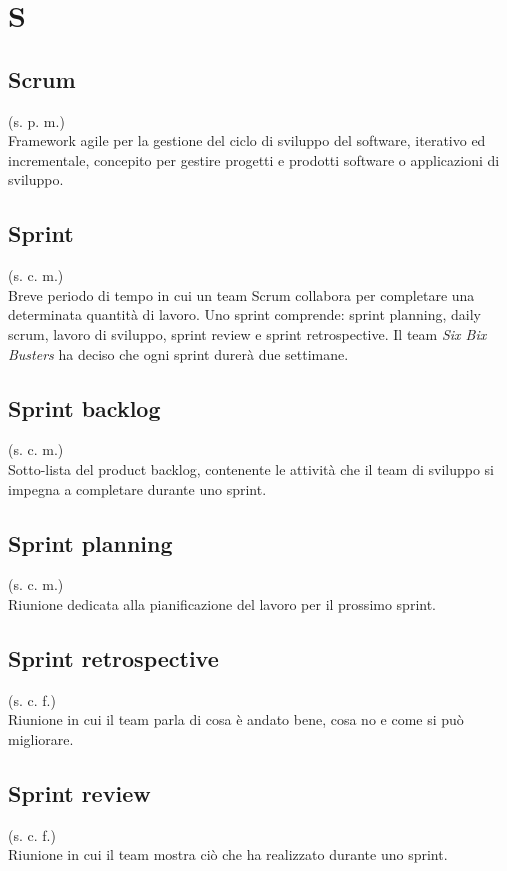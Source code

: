 \section{S}
    \subsection{Scrum}
    (s. p. m.)\\
    Framework agile per la gestione del ciclo di sviluppo del software, 
    iterativo ed incrementale, concepito per gestire progetti e prodotti software 
    o applicazioni di sviluppo.
    \subsection{Sprint}
    \label{Sprint}
    (s. c. m.)\\
    Breve periodo di tempo in cui un team Scrum collabora per completare 
    una determinata quantità di lavoro. Uno sprint comprende:  
    sprint planning, daily scrum, lavoro di sviluppo, 
    sprint review e sprint retrospective. Il team \textit{Six Bix Busters} ha 
    deciso che ogni sprint durerà due settimane.
    \subsection{Sprint backlog}   
    \label{Sprint backlog}
    (s. c. m.)\\
    Sotto-lista del product backlog, contenente le attività che il team di sviluppo 
    si impegna a completare durante uno sprint.
    \subsection{Sprint planning}
    (s. c. m.)\\
    Riunione dedicata alla pianificazione del lavoro per il prossimo sprint. 
    \subsection{Sprint retrospective}
    \label{Sprint retrospective}
    (s. c. f.)\\
    Riunione in cui il team parla di cosa è andato bene, cosa no e come si può migliorare.
    \subsection{Sprint review}
    (s. c. f.)\\ 
    Riunione in cui il team mostra ciò che ha realizzato durante uno sprint.
\pagebreak
